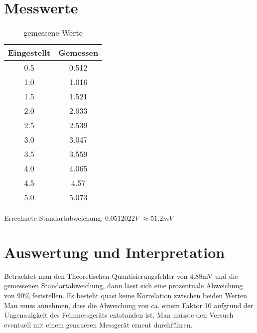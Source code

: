 \section{Messwerte}
\label{chap:VERSUCH_3_MESSWERTE}

\begin{table}[H]
\begin{tabular}{c|c}
Eingestellt & Gemessen \\
\hline
0.5 & 0.512 \\
1.0 & 1.016 \\ 
1.5 & 1.521 \\ 
2.0 & 2.033 \\ 
2.5 & 2.539\\
3.0 & 3.047\\
3.5 & 3.559\\
4.0 & 4.065\\
4.5 & 4.57\\
5.0 & 5.073\\
\end{tabular} 
\centering
\caption{gemessene Werte}
\label{TABLE:VERSUCH3}
\end{table}

Errechnete Standartabweichung: $0.0512022 V$ $ \approx 51.2 mV$
\newpage
\section{Auswertung und Interpretation}
\label{chap:VERSUCH_3_AUSWERTUNG}
Betrachtet man den Theoretischen Quantisierungsfehler von 4.88mV und die gemessenen Standartabweichung, dann lässt sich eine prozentuale Abweichung von 90\% feststellen.
Es besteht quasi keine Korrelation zwischen beiden Werten. Man muss annehmen, dass die Abweichung von ca. einem Faktor 10 aufgrund der Ungenauigkeit des Feinmessgeräts entstanden ist. Man müsste den Versuch eventuell mit einem genaueren Messgerät erneut durchführen. 